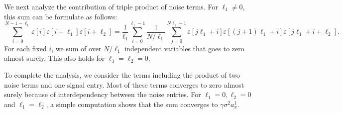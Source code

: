 \documentclass[english]{article}
\numberwithin{equation}{section}
\theoremstyle{plain}
\theoremstyle{definition}
\theoremstyle{remark}
\theoremstyle{plain}
\theoremstyle{remark}
\theoremstyle{plain}
\theoremstyle{plain}
\begin{document}
We next analyze the contribution of triple product of noise terms. For $\ell_1\neq 0$, this sum can be formulate as follows:
\begin{equation*}
\sum_{i=0}^{N-1-\ell_1} \varepsilon[i]\varepsilon[i+\ell_1]\varepsilon[i+\ell_2] = \frac{1}{\ell_1}\sum_{i=0}^{\ell_1-1}\frac{1}{N/\ell_1}\sum_{j=0}^{N\ell_1 -1 }\varepsilon[j\ell_1+i]\varepsilon[(j+1)\ell_1+i]\varepsilon[j\ell_1+i+\ell_2].
\end{equation*}
For each fixed $i$, we sum of over $N/\ell_1$ independent variables that goes to zero almost surely. This also holds for $\ell_1=\ell_2=0$. 

To complete the analysis, we consider the terms including the product of two noise terms and one signal entry. Most of these terms converges to zero almost surely because of interdependency between the noise entries. For $\ell_1=0, \ell_2=0$ and $\ell_1=\ell_2$,  a simple computation shows that the sum converges to $\gamma\sigma^2a_x^1$.
\end{document}
